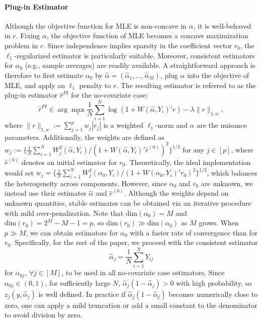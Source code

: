 \documentclass[11pt]{article}
\begin{document}
\paragraph{Plug-in Estimator} Although the objective function for MLE is non-concave in $\alpha$, it is well-behaved in $r$. Fixing $\alpha$, the objective function of MLE becomes a concave maximization problem in $r$. Since independence implies sparsity in the coefficient vector $r_0$, the $\ell_1$-regularized estimator is particularly suitable. Moreover, consistent estimators for $\alpha_0$ (e.g., sample averages) are readily available. A straightforward approach is therefore to first estimate $\alpha_0$ by $\hat{\alpha}=(\hat{\alpha}_1,\ldots,\hat{\alpha}_M)$, plug $\hat{\alpha}$ into the objective of MLE, and apply an $\ell_1$ penalty to $r$. The resulting estimator is referred to as the plug-in estimator $\hat r^{PI}$ for the no-covariate case: 
\begin{equation}\label{eq:PMLE-no-covariates}
     \hat r^{PI}\! \in \!\arg\max_{r}  \displaystyle \frac{1}{N}\sum_{i=1}^N  \log( 1+ W(\hat \alpha,Y_i)'r ) - \lambda \|r\|_{1,w},
\end{equation}
where $\|r\|_{1,w}:= \sum_{j=1}^p w_j |r_j|$ is a weighted $\ell_1$-norm and $\alpha$ are the nuisance parameters. Additionally, the weights are defined as $w_j :=\{\frac{1}{N}\sum_{i=1}^NW_j^2(\hat{\alpha},Y_i)/(1+W(\hat{\alpha},Y_i)'\hat{r}^{(0)})^2\}^{1/2}$ for any $j\in[p]$, where $\hat{r}^{(0)}$ denotes an initial estimator for $r_0$. Theoretically, the ideal implementation would set $w_j =\{\frac{1}{N}\sum_{i=1}^NW_j^2(\alpha_0,Y_i)/(1+W(\alpha_0,Y_i)'r_0)^2\}^{1/2}$, which balances the heterogeneity across components. However, since $\alpha_0$ and $r_0$ are unknown, we instead use their estimates $\hat{\alpha}$ and $\hat{r}^{(0)}$. Although the weights depend on unknown quantities, stable estimates can be obtained via an iterative procedure with mild over-penalization. Note that $\mathrm{dim}(\alpha_0)=M$ and $\mathrm{dim}(r_0)=2^M-M-1=p$, so $\mathrm{dim}(r_0)\gg\mathrm{dim}(\alpha_0)$ as $M$ grows. When $p\gg M$, we can obtain estimators for $\alpha_0$ with a faster rate of convergence than for $r_0$. Specifically, for the rest of the paper, we proceed with the consistent estimator 
\begin{equation}\label{eq:SAA}
    \hat\alpha_j = \frac{1}{N}\sum_{i=1}^N Y_{ij}
\end{equation}
for $\alpha_{0j}$, $\forall j\in [M]$, to be used in all no-covariate case estimators. Since $\alpha_{0j}\in(0,1)$, for sufficiently large $N$, $\hat{\alpha}_j(1-\hat{\alpha}_j)>0$ with high probability, so $z_j(y,\hat{\alpha}_j)$ is well defined. In practice if $\hat{\alpha}_j(1-\hat{\alpha}_j)$ becomes numerically close to zero, one can apply a mild truncation or add a small constant to the denominator to avoid division by zero. 
\end{document}
